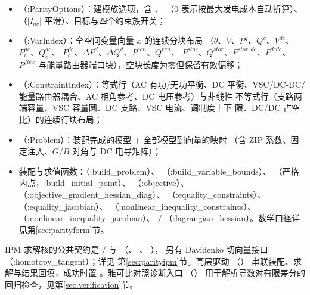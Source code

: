 \begin{itemize}
  \item {}（:ParityOptions）：建模族选项，含 、
        （0 表示按最大发电成本自动折算）、
        （$|I_{ac}|$ 平滑）、目标与四个约束族开关；
  \item {}（:VarIndex）：全空间变量向量 $x$ 的连续分块布局
        （$\theta$、$V$、$P^g$、$Q^g$、$V^{dc}$、$P^{ac}_c$、$Q^{ac}_c$、
        $P^{dc}_c$、$\Delta P^d$、$\Delta Q^d$、$P^{ren}$、$Q^{ren}$、
        $P^{stor}$、$Q^{stor}$、$P^{stor,dc}$、$P^{dcdc}$、$P^{flex}$
        与能量路由器端口块），空块长度为零但保留有效偏移；
  \item {}（:ConstraintIndex）：等式行（AC 有功/无功平衡、DC
        平衡、VSC/DC-DC/能量路由器耦合、AC 相角参考、DC 电压参考）与非线性
        不等式行（支路两端容量、VSC 容量圆、DC 支路、VSC 电流、调制度上下
        限、DC/DC 占空比）的连续行块布局；
  \item {}（:Problem）：装配完成的模型 + 全部模型到向量的映射
        （含 ZIP 系数、固定注入、$G/B$ 对角与 DC 电导矩阵）；
  \item 装配与求值函数：（:build\_problem）、
        （:build\_variable\_bounds）、
        （严格内点，:build\_initial\_point）、
        （:objective）、
        （:objective\_gradient\_hessian\_diag）、
        （:equality\_constraints）、
        （:equality\_jacobian）、
        （:nonlinear\_inequality\_constraints）、
        （:nonlinear\_inequality\_jacobian）、
        /
        （:lagrangian\_hessian）。数学口径详见第\ref{sec:parityform}节。
\end{itemize}

IPM 求解核的公共契约是 / 与
（、
、
），
另有 Davidenko 切向量接口 （:homotopy\_tangent）；详见
第\ref{sec:parityipm}节。高层驱动 
（）
串联装配、求解与结果回填，成功时置
。雅可比对照诊断入口
（）
用于解析导数对有限差分的回归检查，见第\ref{sec:verification}节。

